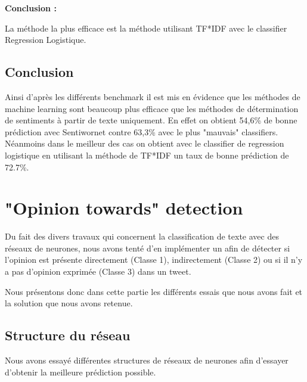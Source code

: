 \par \textbf{Conclusion :} \\
\par La méthode la plus efficace est la méthode utilisant TF*IDF avec le classifier Regression Logistique. \\


\subsection{Conclusion}

\par Ainsi d'après les différents benchmark il est mis en évidence que les méthodes de machine learning sont beaucoup plus efficace que les méthodes de détermination de sentiments à partir de texte uniquement. En effet on obtient 54,6\% de bonne prédiction avec Sentiwornet contre 63,3\% avec le plus "mauvais" classifiers. Néanmoins dans le meilleur des cas on obtient avec le classifier de regression logistique en utilisant la méthode de TF*IDF un taux de bonne prédiction de 72.7\%.


\section{"Opinion towards" detection}

\par Du fait des divers travaux qui concernent la classification de texte avec des réseaux de neurones\cite{cnn}\cite{rnn}, nous avons tenté d'en implémenter un afin de détecter si l'opinion est présente directement (Classe 1), indirectement (Classe 2) ou si il n'y a pas d'opinion exprimée (Classe 3) dans un tweet.

\par Nous présentons donc dans cette partie les différents essais que nous avons fait et la solution que nous avons retenue.

\subsection{Structure du réseau}

\par Nous avons essayé différentes structures de réseaux de neurones afin d'essayer d'obtenir la meilleure prédiction possible.

